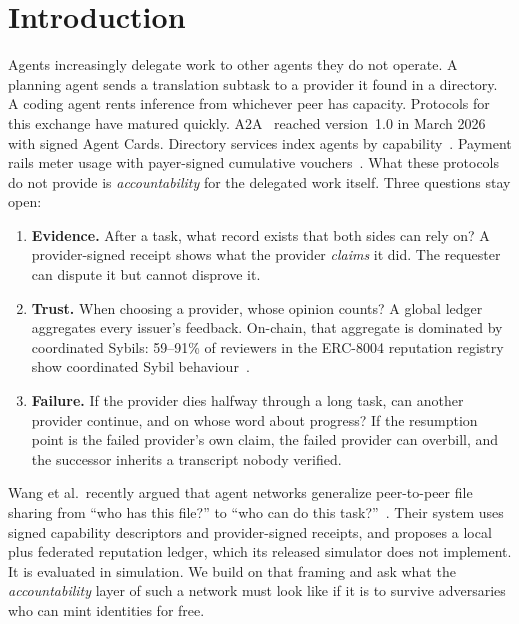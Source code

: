\section{Introduction}
\label{sec:intro}

Agents increasingly delegate work to other agents they do not operate.
A planning agent sends a translation subtask to a provider it found in a
directory. A coding agent rents inference from whichever peer has capacity.
Protocols for this exchange have matured quickly. A2A~\cite{a2a2026}
reached version~1.0 in March 2026 with signed Agent Cards. Directory
services index agents by capability~\cite{ads2026,nanda2025}. Payment
rails meter usage with payer-signed cumulative
vouchers~\cite{mpp2026,x402v2}. What these protocols do not provide is
\emph{accountability} for the delegated work itself. Three questions stay
open:

\begin{enumerate}
\item \textbf{Evidence.} After a task, what record exists that both sides
  can rely on? A provider-signed receipt shows what the provider
  \emph{claims} it did. The requester can dispute it but cannot disprove
  it.
\item \textbf{Trust.} When choosing a provider, whose opinion counts? A
  global ledger aggregates every issuer's feedback. On-chain, that
  aggregate is dominated by coordinated Sybils: 59--91\% of reviewers in
  the ERC-8004 reputation registry show coordinated Sybil
  behaviour~\cite{xiong2026erc8004}.
\item \textbf{Failure.} If the provider dies halfway through a long task,
  can another provider continue, and on whose word about progress? If the
  resumption point is the failed provider's own claim, the failed provider
  can overbill, and the successor inherits a transcript nobody verified.
\end{enumerate}

Wang et al.\ recently argued that agent networks generalize peer-to-peer
file sharing from ``who has this file?'' to ``who can do this
task?''~\cite{wang2026agenticp2p}. Their system uses signed capability
descriptors and provider-signed receipts, and proposes a local plus
federated reputation ledger, which its released simulator does not
implement. It is evaluated in simulation. We build on that framing
and ask what the \emph{accountability} layer of such a network must look
like if it is to survive adversaries who can mint identities for free.


